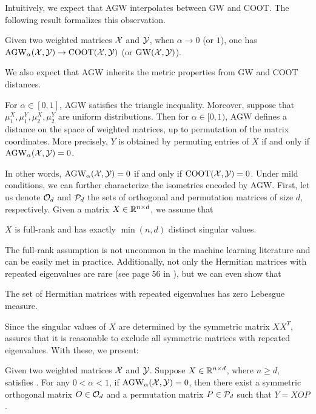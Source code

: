 Intuitively, we expect that AGW interpolates between GW and COOT.
The following result formalizes this observation.
\begin{proposition}
\label{prop:basic_prop}
Given two weighted matrices $\mathcal X$ and $\mathcal Y$, when $\alpha \to 0$ (or $1$),
one has $\text{AGW}_{\alpha}(\mathcal X, \mathcal Y) \to \text{COOT}(\mathcal X, \mathcal Y)$ (or $\text{GW}(\mathcal X, \mathcal Y)$).
\end{proposition}
We also expect that AGW inherits the metric properties from GW and COOT distances.
\begin{proposition}
    \label{prop:metric_agw}
    For $\alpha \in [0, 1]$, AGW satisfies the triangle inequality. Moreover,
    suppose that $\mu_1^X, \mu_1^Y, \mu_2^X, \mu_2^Y$ are uniform distributions. Then for
    $\alpha \in [0, 1)$, AGW defines a distance on the space of weighted matrices,
    up to permutation of the matrix coordinates. More precisely, $Y$ is
    obtained by permuting entries of $X$ if and only if $\text{AGW}_{\alpha}(\mathcal X, \mathcal Y) = 0$.
\end{proposition}
In other words, $\text{AGW}_{\alpha}(\mathcal X, \mathcal Y) = 0$ if and only if $\text{COOT}(\mathcal X, \mathcal Y) = 0$.
Under mild conditions, we can further characterize the isometries encoded by AGW.
First, let us denote $\mathcal O_d$ and $\mathcal P_d$ the sets of orthogonal and permutation matrices of size $d$,
respectively. Given a matrix $X \in \mathbb R^{n \times d}$, we assume that
\begin{assumption}
    \label{assumption:1}
    $X$ is full-rank and has exactly $\min(n, d)$ distinct singular values.
\end{assumption}
The full-rank assumption is not uncommon in the machine learning literature \citep{Kenji19}
and can be easily met in practice. Additionally,
not only the Hermitian matrices with repeated eigenvalues are rare (see page 56 in \citep{Tao12}),
but we can even show that
\begin{corollary}
\label{corr:hermitian}
    The set of Hermitian matrices with repeated eigenvalues has zero Lebesgue measure.
\end{corollary}
Since the singular values of $X$ are determined by the symmetric matrix $X X^T$,
 assures that it is reasonable to exclude all symmetric matrices
with repeated eigenvalues. With these, we present:
\begin{theorem}
\label{thm:invariant}
Given two weighted matrices $\mathcal X$ and $\mathcal Y$. Suppose $X \in \mathbb R^{n \times d}$,
where $n \geq d$, satisfies .
For any $0 < \alpha < 1$, if $\text{AGW}_{\alpha}(\mathcal X, \mathcal Y) = 0$,
then there exist a symmetric orthogonal matrix $O \in \mathcal O_d$ and
a permutation matrix $P \in \mathcal P_d$ such that $Y = X OP$.
\end{theorem}

